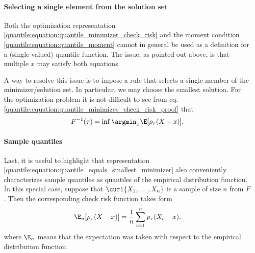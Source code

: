  
%  

\paragraph{Selecting a single element from the solution set}
 
Both the optimization representation \eqref{quantile:equation:quantile_minimizer_check_risk} and the moment condition \eqref{quantile:equation:quantile_moment} cannot in general be used  as a definition for a (single-valued) quantile function.
%
 The issue, as pointed out above, is that multiple $x$ may satisfy both equations.
 
 A way to resolve this issue is to impose a rule that selects a single member of the minimizer/solution set. 
  In particular, we may choose the smallest solution. 
  For the optimization problem it is not difficult to see from eq. \eqref{quantile:equation:quantile_minimizes_check_risk_proof} that 
   \begin{equation}\label{quantile:equation:quantile_equals_smallest_minimizer}
  F^{-1}(\tau) = 	\inf \argmin_x  \E[\rho_{\tau}(X-x)].
  \end{equation}
 
\paragraph{Sample quantiles}

Last,  it is useful to highlight that representation \eqref{quantile:equation:quantile_equals_smallest_minimizer} also conveniently characterizes sample quantiles as quantiles of the empirical distribution function. 
%
In this special case, suppose that $\curl{X_1, \dots, X_n}$ is a sample of size $n$ from $F$. Then the corresponding check risk function takes form
\begin{equation}\label{quantile:equation:empirical_check_risk}
	 \E_n[\rho_{\tau}(X-x)]  = \dfrac{1}{n} \sum_{i=1}^n \rho_{\tau} (X_i - x).
\end{equation}
where
$\E_n$ means that the expectation was taken with respect to the empirical distribution function. 

